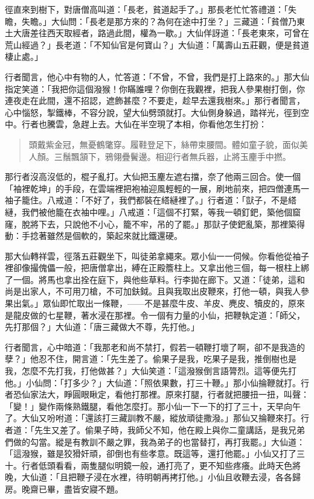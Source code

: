 徑直來到樹下，對唐僧高叫道：「長老，貧道起手了。」那長老忙忙答禮道：「失瞻，失瞻。」大仙問：「長老是那方來的？為何在途中打坐？」三藏道：「貧僧乃東土大唐差往西天取經者，路過此間，權為一歇。」大仙佯訝道：「長老東來，可曾在荒山經過？」長老道：「不知仙官是何寶山？」大仙道：「萬壽山五莊觀，便是貧道棲止處。」

行者聞言，他心中有物的人，忙答道：「不曾，不曾，我們是打上路來的。」那大仙指定笑道：「我把你這個潑猴！你瞞誰哩？你倒在我觀裡，把我人參果樹打倒，你連夜走在此間，還不招認，遮飾甚麼？不要走，趁早去還我樹來。」那行者聞言，心中惱怒，掣鐵棒，不容分說，望大仙劈頭就打。大仙側身躲過，踏祥光，徑到空中。行者也騰雲，急趕上去。大仙在半空現了本相，你看他怎生打扮：
\begin{quote}
頭戴紫金冠，無憂鶴氅穿。履鞋登足下，絲帶束腰間。體如童子貌，面似美人顏。三鬚飄頷下，鴉翎疊鬢邊。相迎行者無兵器，止將玉麈手中撚。
\end{quote}

那行者沒高沒低的，棍子亂打。大仙把玉麈左遮右擋，奈了他兩三回合。使一個「袖裡乾坤」的手段，在雲端裡把袍袖迎風輕輕的一展，刷地前來，把四僧連馬一袖子籠住。八戒道：「不好了，我們都裝在䌋縺裡了。」行者道：「獃子，不是䌋縺，我們被他籠在衣袖中哩。」八戒道：「這個不打緊，等我一頓釘鈀，築他個窟窿，脫將下去，只說他不小心，籠不牢，吊的了罷。」那獃子使鈀亂築，那裡築得動：手捻著雖然是個軟的，築起來就比鐵還硬。

那大仙轉祥雲，徑落五莊觀坐下，叫徒弟拿繩來。眾小仙一一伺候。你看他從袖子裡卻像撮傀儡一般，把唐僧拿出，縛在正殿簷柱上。又拿出他三個，每一根柱上綁了一個。將馬也拿出拴在庭下，與他些草料。行李拋在廊下。又道：「徒弟，這和尚是出家人，不可用刀槍，不可加鈇鉞。且與我取出皮鞭來，打他一頓，與我人參果出氣。」眾仙即忙取出一條鞭，——不是甚麼牛皮、羊皮、麂皮、犢皮的，原來是龍皮做的七星鞭，著水浸在那裡。令一個有力量的小仙，把鞭執定道：「師父，先打那個？」大仙道：「唐三藏做大不尊，先打他。」

行者聞言，心中暗道：「我那老和尚不禁打，假若一頓鞭打壞了啊，卻不是我造的孽？」他忍不住，開言道：「先生差了。偷果子是我，吃果子是我，推倒樹也是我，怎麼不先打我，打他做甚？」大仙笑道：「這潑猴倒言語膂烈。這等便先打他。」小仙問：「打多少？」大仙道：「照依果數，打三十鞭。」那小仙掄鞭就打。行者恐仙家法大，睜圓眼瞅定，看他打那裡。原來打腿，行者就把腰扭一扭，叫聲：「變！」變作兩條熟鐵腿，看他怎麼打。那小仙一下一下的打了三十，天早向午了。大仙又吩咐道：「還該打三藏訓教不嚴，縱放頑徒撒潑。」那仙又掄鞭來打。行者道：「先生又差了。偷果子時，我師父不知，他在殿上與你二童講話，是我兄弟們做的勾當。縱是有教訓不嚴之罪，我為弟子的也當替打，再打我罷。」大仙道：「這潑猴，雖是狡猾奸頑，卻倒也有些孝意。既這等，還打他罷。」小仙又打了三十。行者低頭看看，兩隻腿似明鏡一般，通打亮了，更不知些疼癢。此時天色將晚，大仙道：「且把鞭子浸在水裡，待明朝再拷打他。」小仙且收鞭去浸，各各歸房。晚齋已畢，盡皆安寢不題。

